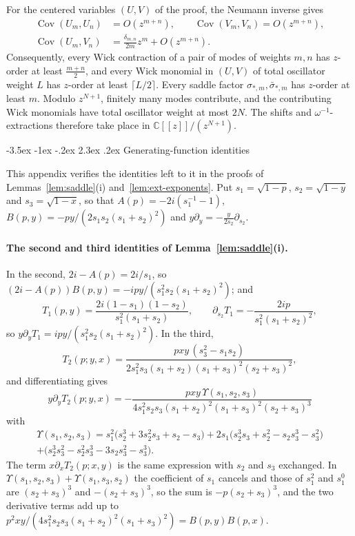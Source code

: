 \documentclass[twoside,10pt]{article}
\makeatletter
\numberwithin{equation}{section}
\theoremstyle{slbody}
\theoremstyle{definition}
\theoremstyle{remark}
\renewcommand{\section}{%
  \@startsection{section}{1}{\z@}%
    {-3.5ex \@plus -1ex \@minus -.2ex}%
    {2.3ex \@plus .2ex}%
    {\normalfont\large\bfseries}}
\makeatother
\begin{document}
For the centered variables \((U,V)\) of the proof, the Neumann inverse gives
\begin{align*}
 \operatorname{Cov}(U_m,U_n)&=O(z^{m+n}),\qquad
 \operatorname{Cov}(V_m,V_n)=O(z^{m+n}),\\
 \operatorname{Cov}(U_m,V_n)&=\frac{\delta_{m,n}}{2m}z^m+O(z^{m+n}).
\end{align*}
Consequently, every Wick contraction of a pair of modes of weights \(m,n\) has
\(z\)-order at least \(\frac{m+n}{2}\), and every Wick monomial in \((U,V)\) of
total oscillator weight \(L\) has \(z\)-order at least \(\lceil L/2\rceil\).
Every saddle factor \(\sigma_{*,m},\bar\sigma_{*,m}\) has \(z\)-order at
least \(m\).  Modulo \(z^{N+1}\), finitely many modes contribute, and the
contributing Wick monomials have total oscillator weight at most \(2N\).  The
shifts and \(\omega^{-1}\)-extractions therefore take place in
\(\mathbb C[[z]]/(z^{N+1})\).

\section{Generating-function identities}\label{app:gf}

This appendix verifies the identities left to it in the proofs of
Lemmas~\ref{lem:saddle}(i) and~\ref{lem:ext-exponents}.  Put
\(s_1=\sqrt{1-p}\), \(s_2=\sqrt{1-y}\) and \(s_3=\sqrt{1-x}\), so that
\(A(p)=-2i(s_1^{-1}-1)\), \(B(p,y)=-py/(2s_1s_2(s_1+s_2)^2)\) and
\(y\partial_y=-\frac{y}{2s_2}\partial_{s_2}\).

\paragraph{The second and third identities of Lemma~\ref{lem:saddle}(i).}
In the second, \(2i-A(p)=2i/s_1\), so
\((2i-A(p))B(p,y)=-ipy/(s_1^2s_2(s_1+s_2)^2)\); and
\[
 T_1(p,y)=\frac{2i(1-s_1)(1-s_2)}{s_1^2(s_1+s_2)},\qquad
 \partial_{s_2}T_1=-\frac{2ip}{s_1^2(s_1+s_2)^2},
\]
so \(y\partial_yT_1=ipy/(s_1^2s_2(s_1+s_2)^2)\).  In the third,
\[
 T_2(p;y,x)=\frac{pxy\,(s_3^2-s_1s_2)}{2s_1^2s_3(s_1+s_2)(s_1+s_3)^2(s_2+s_3)^2},
\]
and differentiating gives
\[
 y\partial_yT_2(p;y,x)=-\frac{pxy\,\Upsilon(s_1,s_2,s_3)}
 {4s_1^2s_2s_3(s_1+s_2)^2(s_1+s_3)^2(s_2+s_3)^3}
\]
with
\begin{multline*}
 \Upsilon(s_1,s_2,s_3)=s_1^2\bigl(s_2^3+3s_2^2s_3+s_2-s_3\bigr)
 +2s_1\bigl(s_2^3s_3+s_2^2-s_2s_3^3-s_3^2\bigr)\\
 +\bigl(s_2^3s_3^2-s_2^2s_3^3-3s_2s_3^2-s_3^3\bigr).
\end{multline*}
The term \(x\partial_xT_2(p;x,y)\) is the same expression with \(s_2\) and
\(s_3\) exchanged.  In \(\Upsilon(s_1,s_2,s_3)+\Upsilon(s_1,s_3,s_2)\) the
coefficient of \(s_1\) cancels and those of \(s_1^2\) and \(s_1^0\) are
\((s_2+s_3)^3\) and \(-(s_2+s_3)^3\), so the sum is \(-p(s_2+s_3)^3\), and the
two derivative terms add up to
\(p^2xy/(4s_1^2s_2s_3(s_1+s_2)^2(s_1+s_3)^2)=B(p,y)B(p,x)\).
\end{document}
